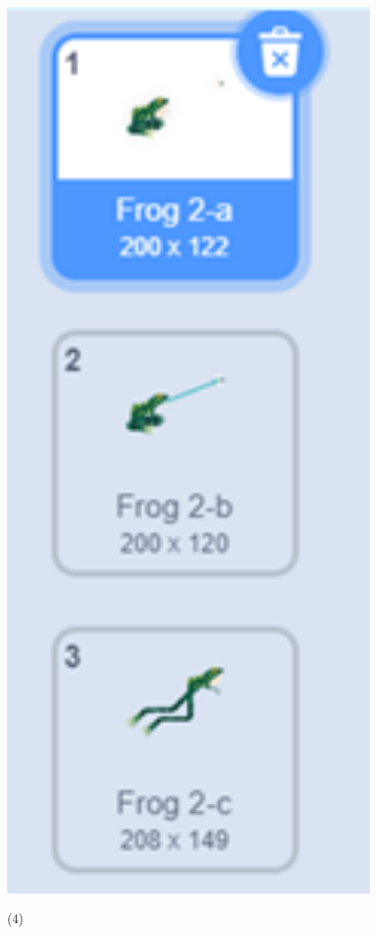 \documentclass[10.5pt, a4paper]{article}
\begin{document}
\begin{enumerate}
        \begin{minipage}{.1\textwidth}
            \centering
            \includegraphics[width=0.8\textwidth]{15.png}
        \end{minipage}
        \begin{minipage}{.78\textwidth}
            \begin{tasks}(4)

\end{tasks}
\end{minipage}
\end{enumerate}
\end{document}

